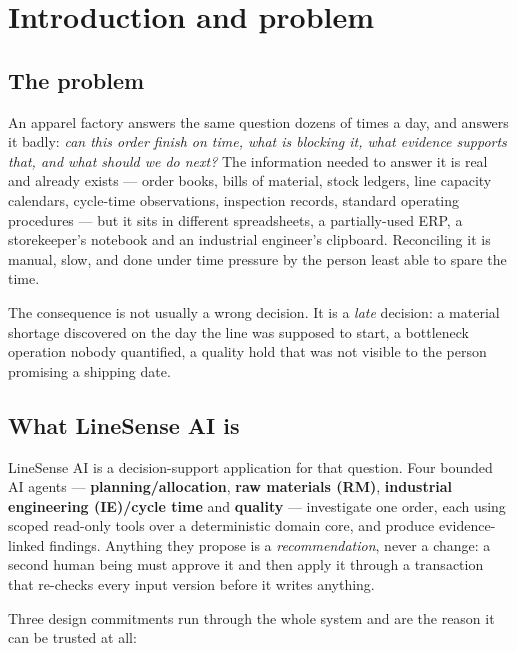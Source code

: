\documentclass[11pt,a4paper]{article}
\begin{document}
\clearpage
\tableofcontents
\clearpage

\section{Introduction and problem}

\subsection{The problem}

An apparel factory answers the same question dozens of times a day, and answers
it badly: \emph{can this order finish on time, what is blocking it, what
evidence supports that, and what should we do next?} The information needed to
answer it is real and already exists --- order books, bills of material, stock
ledgers, line capacity calendars, cycle-time observations, inspection records,
standard operating procedures --- but it sits in different spreadsheets, a
partially-used ERP, a storekeeper's notebook and an industrial engineer's
clipboard. Reconciling it is manual, slow, and done under time pressure by the
person least able to spare the time.

The consequence is not usually a wrong decision. It is a \emph{late} decision:
a material shortage discovered on the day the line was supposed to start, a
bottleneck operation nobody quantified, a quality hold that was not visible to
the person promising a shipping date.

\subsection{What LineSense AI is}

LineSense AI is a decision-support application for that question. Four bounded
AI agents --- \textbf{planning/allocation}, \textbf{raw materials (RM)},
\textbf{industrial engineering (IE)/cycle time} and \textbf{quality} ---
investigate one order, each using scoped read-only tools over a deterministic
domain core, and produce evidence-linked findings. Anything they propose is a
\emph{recommendation}, never a change: a second human being must approve it and
then apply it through a transaction that re-checks every input version before it
writes anything.

Three design commitments run through the whole system and are the reason it can
be trusted at all:
\end{document}
